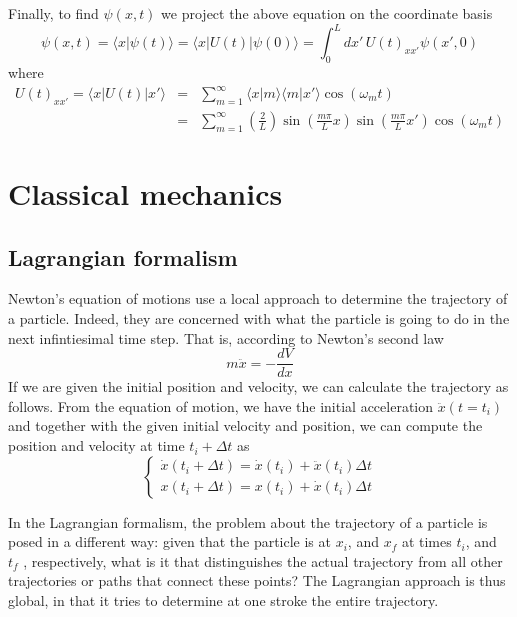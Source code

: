 \documentclass[11pt,fleqn]{book} %
\newcommand{\bra}[1]{\langle #1|}
\newcommand{\ket}[1]{| #1\rangle}
\newcommand{\scalar}[2]{\langle #1| #2\rangle}
\begin{document}
Finally, to find $\psi(x,t)$ we project the above equation on the coordinate basis
\begin{equation*}
    \psi(x,t) = \scalar{x}{\psi(t)} = \bra{x}U(t)\ket{\psi(0)} = \int_0^L\!\!dx'\,U(t)_{xx'}\psi(x', 0)
\end{equation*}
where 
\begin{eqnarray*}
    U(t)_{xx'} = \bra{x}U(t)\ket{x'} &=& \sum_{m=1}^\infty\scalar{x}{m}\scalar{m}{x'}\cos\left(\omega_m t\right) \\
    &=& \sum_{m=1}^\infty\left(\frac{2}{L}\right)\sin\left(\frac{m\pi}{L}x\right)\sin\left(\frac{m\pi}{L}x'\right)\cos\left(\omega_m t\right)
\end{eqnarray*}

\chapter{Classical mechanics}
\section{Lagrangian formalism}
Newton's equation of motions use a local approach to determine the trajectory of a particle. Indeed, they are concerned with what the particle
is going to do in the next infintiesimal time step. That is, according to Newton's second law
\begin{equation*}
    m\ddot{x} = -\frac{dV}{dx}
\end{equation*}
If we are given the initial position and velocity, we can calculate the trajectory as follows. From the equation of motion, we have the 
initial acceleration $\ddot{x}(t=t_i)$ and together with the given initial velocity and position, we can compute the position and velocity
at time $t_i + \Delta t$ as
\begin{equation*}
    \left\{
        \begin{array}{c}
            \dot{x}(t_i+\Delta t) = \dot{x}(t_i) + \ddot{x}(t_i)\Delta t \\
            x(t_i + \Delta t) = x(t_i) + \dot{x}(t_i)\Delta t
        \end{array}
    \right.
\end{equation*}

In the Lagrangian formalism, the problem about the trajectory of a particle
is posed in a different way: given that the particle is at $x_i$, and $x_f$ at times $t_i$, and
$t_f$ , respectively, what is it that distinguishes the actual trajectory from all other
trajectories or paths that connect these points?
The Lagrangian approach is thus global, in that it tries to determine at one stroke the entire trajectory.
\end{document}
